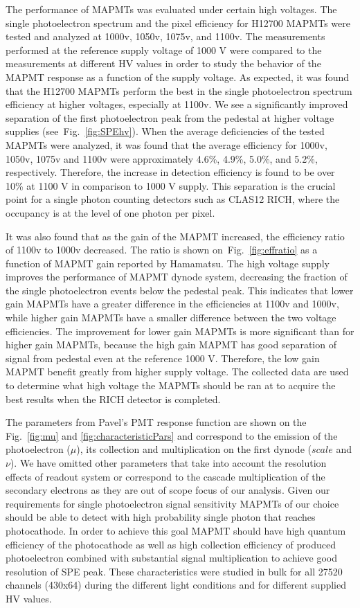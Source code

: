 \iffalse
The performance of MAPMTs was evaluated under certain high voltages.
The single photoelectron spectrum and the pixel efficiency for H12700 MAPMTs were tested and analyzed at 1000v, 1050v, 1075v, and 1100v.
The measurements performed at the reference supply voltage of 1000 V were compared to the measurements at different HV values in order to study the behavior of the MAPMT response as a function of the supply voltage.
As expected, it was found that the H12700 MAPMTs perform the best in the single photoelectron spectrum efficiency at higher voltages, especially at 1100v.
We see a significantly improved separation of the first photoelectron peak from the pedestal at higher voltage supplies (see~Fig.~\ref{fig:SPEhv}).
When the average deficiencies of the tested MAPMTs were analyzed, it was found that the average efficiency for 1000v, 1050v, 1075v and 1100v were approximately 4.6\%, 4.9\%, 5.0\%, and 5.2\%, respectively.
Therefore, the increase in detection efficiency is found to be over 10\% at 1100 V in comparison to 1000 V supply.
This separation is the crucial point for a single photon counting detectors such as CLAS12 RICH, where the occupancy is at the level of one photon per pixel.



It was also found that as the gain of the MAPMT increased, the efficiency ratio of 1100v to 1000v decreased.
The ratio is shown on~Fig.~\ref{fig:effratio} as a function of MAPMT gain reported by Hamamatsu.
The high voltage supply improves the performance of MAPMT dynode system, decreasing the fraction of the single photoelectron events below the pedestal peak.
This indicates that lower gain MAPMTs have a greater difference in the efficiencies at 1100v and 1000v, while higher gain MAPMTs have a smaller difference between the two voltage efficiencies.
The improvement for lower gain MAPMTs is more significant than for higher gain MAPMTs, because the high gain MAPMT has good separation of signal from pedestal even at the reference 1000 V.
Therefore, the low gain MAPMT benefit greatly from higher supply voltage.
The collected data are used to determine what high voltage the MAPMTs should be ran at to acquire the best results when the RICH detector is completed.


The parameters from Pavel's PMT response function are shown on the Fig.~\ref{fig:mu} and \ref{fig:characteristicPars} and correspond to the emission of the photoelectron ($\mu$), its collection and multiplication on the first dynode ($scale$ and $\nu$).
We have omitted other parameters that take into account the resolution effects of readout system or correspond to the cascade multiplication of the secondary electrons as they are out of scope focus of our analysis.
Given our requirements for single photoelectron signal sensitivity MAPMTs of our choice should be able to detect with high probability single photon that reaches photocathode.
In order to achieve this goal MAPMT should have high quantum efficiency of the photocathode as well as high collection efficiency of produced photoelectron combined with substantial signal multiplication to achieve good resolution of SPE peak.
These characteristics were studied in bulk for all 27520 channels (430x64) during the different light conditions and for different supplied HV values.


